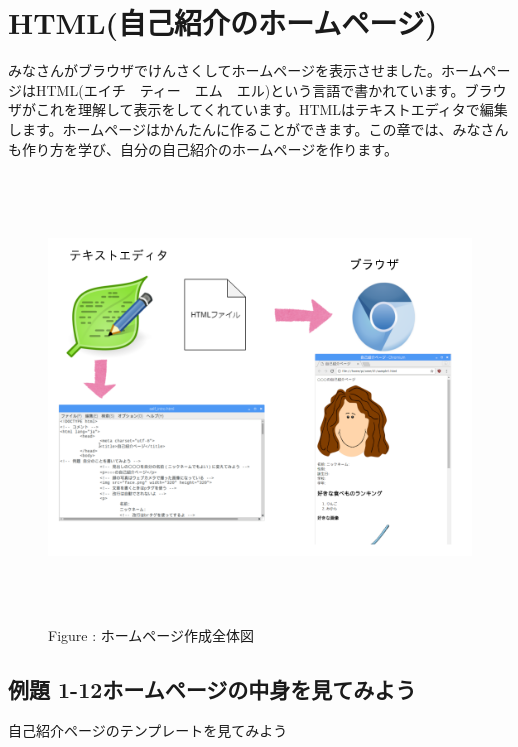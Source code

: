 \documentclass[a4paper,12pt]{jarticle}
\begin{document}
\section{HTML(自己紹介のホームページ)}
みなさんがブラウザでけんさくしてホームページを表示させました。ホームページはHTML(エイチ　ティー　エム　エル)という言語で書かれています。ブラウザがこれを理解して表示をしてくれています。HTMLはテキストエディタで編集します。ホームページはかんたんに作ることができます。この章では、みなさんも作り方を学び、自分の自己紹介のホームページを作ります。


\bigskip


\bigskip


\bigskip


\bigskip



\begin{figure}[hb]
  \centering
  \begin{minipage}{15.801cm}
    {\upshape
      \includegraphics[width=15.801cm,height=11.85cm]{textbook-img140.png}
      \newline
      Figure : ホームページ作成全体図}
  \end{minipage}
\end{figure}
\clearpage\subsection{例題
  1-12ホームページの中身を見てみよう}
自己紹介ページのテンプレートを見てみよう
\end{document}
